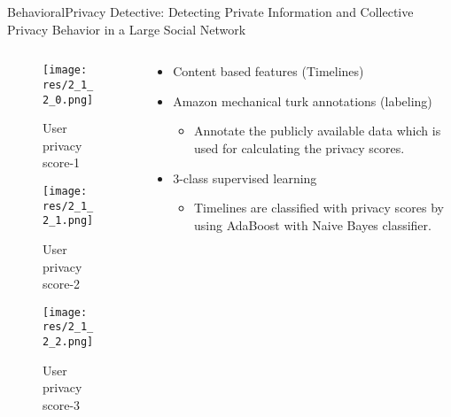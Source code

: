 \begin{frame}{Behavioral}{Privacy Detective: Detecting Private Information and Collective Privacy Behavior in a Large Social Network \cite{caliskanislam_privacy_2014}}


	\begin{columns}
	
		\begin{column}{0.35\textwidth}
				\begin{center}
					\begin{figure}
						\texttt{[image: res/2\_1\_2\_0.png]}
						\caption{\label{fig:2_1_2_0} User privacy score-1}
					\end{figure}
				
					\begin{figure}
						\texttt{[image: res/2\_1\_2\_1.png]}
						\caption{\label{fig:2_1_2_1} User privacy score-2}
					\end{figure}
				
					\begin{figure}
						\texttt{[image: res/2\_1\_2\_2.png]}
						\caption{\label{fig:2_1_2_2} User privacy score-3}
					\end{figure}
				\end{center}
		\end{column}
		
		\begin{column}{0.65\textwidth}
		
			\begin{itemize}
		
				\item Content based features (Timelines)
				
				\item Amazon mechanical turk annotations (labeling)
					\begin{itemize}
						\item Annotate the publicly available data which is used for calculating the privacy scores.
					\end{itemize}
					
				\item 3-class supervised learning
					\begin{itemize}
				
						\item Timelines are classified with privacy scores by using AdaBoost with Naive Bayes classifier.
				
					\end{itemize}
					

\end{itemize}
\end{column}
\end{columns}
\end{frame}
